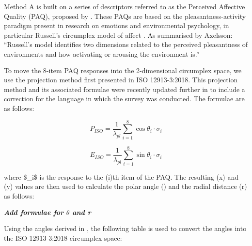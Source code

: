\documentclass[
  authoryear,
  preprint,
  3p]{elsarticle}
\begin{document}
Method A is built on a series of descriptors referred to as the
Perceived Affective Quality (PAQ), proposed by
\citep{Ax/elsson2010principal}. These PAQs are based on the
pleasantness-activity paradigm present in research on emotions and
environmental psychology, in particular Russell's circumplex model of
affect \citep{Russell1980circumplex}. As summarised by Axelsson:
``Russell's model identifies two dimensions related to the perceived
pleasantness of environments and how activating or arousing the
environment is.''

To move the 8-item PAQ responses into the 2-dimensional circumplex
space, we use the projection method first presented in ISO 12913-3:2018.
This projection method and its associated formulae were recently updated
further in \citet{Aletta2024} to include a correction for the language
in which the survey was conducted. The formulae are as follows:

\[
P_{ISO} = \frac{1}{\lambda_{pl}} \sum_{i=1}^{8} \cos \theta_i \cdot \sigma_i
\]

\[
E_{ISO} = \frac{1}{\lambda_{pl}} \sum_{i=1}^{8} \sin \theta_i \cdot \sigma_i 
\]

where \$\_i\$ is the response to the (i)th item of the PAQ.
The resulting (x) and (y) values are then used to calculate the polar
angle (\theta) and the radial distance (r) as follows:

\textbf{\emph{Add formulae for \(\theta\) and r}}

Using the angles derived in \citet{Aletta2024}, the following table is
used to convert the angles into the ISO 12913-3:2018 circumplex space:


  
\end{document}
